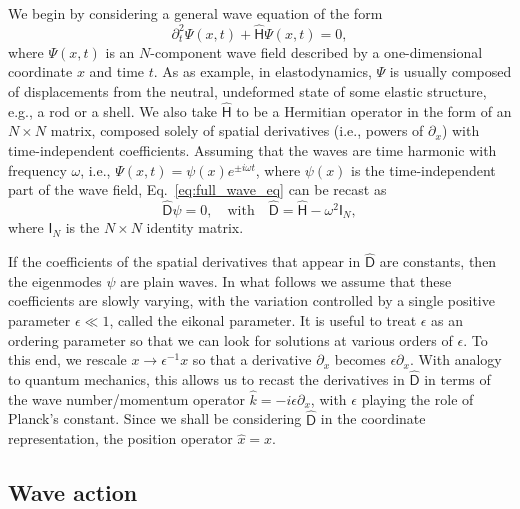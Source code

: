 We begin by considering a general wave equation of the form
%
\begin{equation}
  \partial_{t}^{2}\Psi(x,t) + \widehat{\mathsf{H}}\Psi(x,t) = 0,
  \label{eq:full_wave_eq}
\end{equation}
%
where $\Psi(x,t)$ is an $N$-component wave field described by a one-dimensional coordinate $x$ and time $t$.
As as example, in elastodynamics, $\Psi$ is usually composed of displacements from the neutral, undeformed state of some elastic structure, e.g., a rod or a shell.
We also take $\widehat{\mathsf{H}}$ to be a Hermitian operator in the form of an $N\times N$ matrix, composed solely of spatial derivatives (i.e., powers of $\partial_{x}$) with time-independent coefficients.
Assuming that the waves are time harmonic with frequency $\omega$, i.e., $\Psi(x, t) = \psi(x)e^{\pm i\omega t}$, where $\psi(x)$ is the time-independent part of the wave field, Eq.~\eqref{eq:full_wave_eq} can be recast as
%
\begin{equation}
  \widehat{\mathsf{D}}\psi = 0,\quad \text{with}\quad \widehat{\mathsf{D}} = \widehat{\mathsf{H}} - \omega^{2}\mathsf{I}_{N},
  \label{eq:ev_problem}
\end{equation}
%
where $\mathsf{I}_{N}$ is the $N\times N$ identity matrix.

If the coefficients of the spatial derivatives that appear in $\widehat{\mathsf{D}}$ are constants, then the eigenmodes $\psi$ are plain waves.
In what follows we assume that these coefficients are slowly varying, with the variation controlled by a single positive parameter $\epsilon \ll 1$, called the eikonal parameter.
It is useful to treat $\epsilon$ as an ordering parameter so that we can look for solutions at various orders of $\epsilon$.
To this end, we rescale $x \to \epsilon^{-1}x$ so that a derivative $\partial_{x}$ becomes $\epsilon \partial_x$.
With analogy to quantum mechanics, this allows us to recast the derivatives in $\widehat{\mathsf{D}}$ in terms of the wave number/momentum operator $\hat{k} = -i\epsilon \partial_{x}$, with $\epsilon$ playing the role of Planck's constant.
Since we shall be considering $\widehat{\mathsf{D}}$ in the coordinate representation, the position operator $\hat{x} = x$.

\subsection{Wave action}

